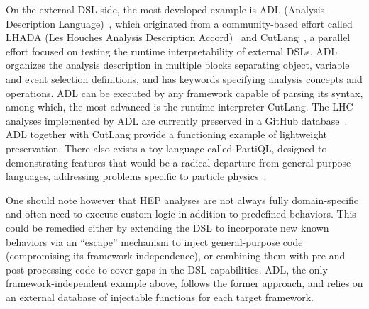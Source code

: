 \documentclass[11pt]{article}
\begin{document}
On the external DSL side, the most developed example is ADL (Analysis Description Language)~\cite{adlweb, Unel:2021edl}, which originated from a community-based effort called LHADA (Les Houches Analysis Description Accord)~\cite{Brooijmans:2016vro} and CutLang~\cite{Sekmen:2018ehb}, a parallel effort focused on testing the runtime interpretability of external DSLs. ADL organizes the analysis description in multiple blocks separating object, variable and event selection definitions, and has keywords specifying analysis concepts and operations. 
ADL can be executed by any framework capable of parsing its syntax, among which, the most advanced is the runtime interpreter CutLang. The LHC analyses implemented by ADL are currently preserved in a GitHub database~\cite{adllhcanl}. ADL together with CutLang provide a functioning example of lightweight preservation. There also exists a toy language called PartiQL, designed to demonstrating features that would be a radical departure from general-purpose languages, addressing problems specific to particle physics~\cite{PartiQL}. 

One should note however that HEP analyses are not always fully domain-specific and often need to execute custom logic in addition to predefined behaviors. This could be remedied either by extending the DSL to incorporate new known behaviors via an ``escape'' mechanism to inject general-purpose code (compromising its framework independence), or combining them with pre-and post-processing code to cover gaps in the DSL capabilities. ADL, the only framework-independent example above, follows the former approach, and relies on an external database of injectable functions for each target framework.


\end{document}
